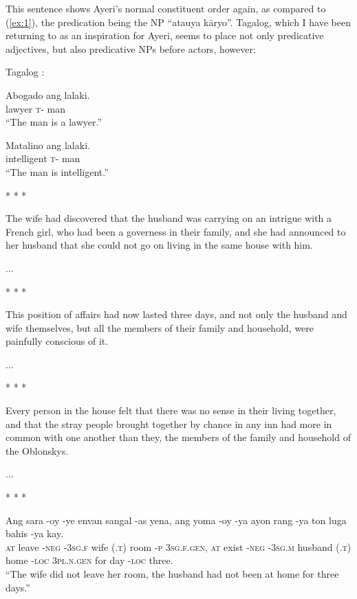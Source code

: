 \documentclass[12pt,paper=letter]{scrartcl}
\newcommand{\q}[1]{\enquote{#1}} %
\newcommand{\divider}{\vspace{0.5\baselineskip} \centerline{* * *} \vspace{0.5\baselineskip}}
\newcommand{\mor}[1]{\textsc{\lowercase{#1}}}
\begin{document}
This sentence shows Ayeri's normal constituent order again, as compared to 
(\ref{ex:1}), the predication being the NP \q{atauya kāryo}. Tagalog,
which I have been returning to as an inspiration for Ayeri, seems to place 
not only predicative adjectives, but also predicative NPs before actors, however:

\begin{exe}
     Tagalog \autocite[499]{schachter}:
    \begin{xlist}
	\ex
	\gll Abogado ang lalaki. \\
	lawyer \mor{T-} man \\
	\glt \enquote{The man is a lawyer.}
	
	\ex
	\gll Matalino ang lalaki. \\
	intelligent \mor{T-} man \\
	\glt \enquote{The man is intelligent.}
    \end{xlist}
\end{exe}

\divider

The wife had discovered that the husband was carrying on an intrigue with a French girl, who had been a governess in their family, and she had announced to her husband that she could not go on living in the same house with him.

\begin{exe}
    \ex ...
\end{exe}

\divider

This position of affairs had now lasted three days, and not only the husband and wife themselves, but all the members of their family and household, were painfully conscious of it.

\begin{exe}
    \ex ...
\end{exe}

\divider

Every person in the house felt that there was no sense in their living together, and that the stray people brought together by chance in any inn had more in common with one another than they, the members of the family and household of the Oblonskys.

\begin{exe}
    \ex ...
\end{exe}

\divider

\begin{exe}
    \ex
    \gll Ang sara -oy -ye envan {} sangal -as yena, ang yoma -oy -ya ayon {} 
	rang -ya ton luga bahis -ya kay. \\
    \mor{AT} leave \mor{-NEG} \mor{-3SG.F} wife \mor{(.T)} room \mor{-P} 
	\mor{3SG.F.GEN}, \mor{AT} exist \mor{-NEG} \mor{-3SG.M} husband 
	\mor{(.T)} home \mor{-LOC} \mor{3PL.N.GEN} for day \mor{-LOC} three. \\
    \glt \enquote{The wife did not leave her room, the husband had not been
	at home for three days.}
\end{exe}
\end{document}
